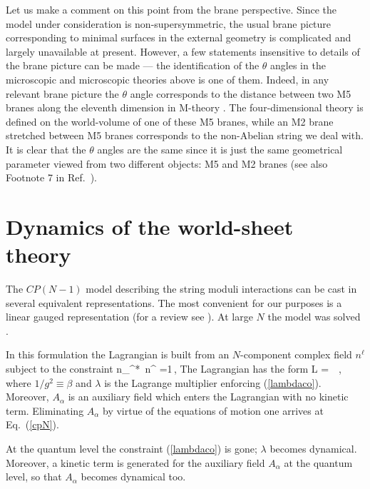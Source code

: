 Let us make  a comment on this point from
the  brane perspective. Since the model under consideration is 
non-supersymmetric,  the usual brane picture corresponding
to  minimal surfaces in the external geometry is
complicated and largely unavailable at present. However,
a few statements  insensitive to details
of the brane picture can be made --- the identification
of the $\theta$ angles in the microscopic and microscopic theories above
is one of them. Indeed, in any
relevant brane picture the $\theta$ angle corresponds
to the distance between two M5 branes along the
eleventh dimension in M-theory \cite{haho}. The four-dimensional
theory is defined on the world-volume of one of these M5 branes,
while  an M2 brane stretched between M5
branes corresponds to the non-Abelian string we deal with.
It is clear that the $\theta$ angles are the same since it is just
the same geometrical parameter viewed
from two different objects: M5 and M2 branes (see also Footnote 7
in Ref.~\cite{HananyTong}).

\section{Dynamics of the world-sheet theory}
\label{Dyn}

The $CP(N-1)$ model
describing the string moduli interactions can be cast in
several equivalent representations.
The most convenient for our purposes
is a linear gauged representation
(for a review see \cite{NSVZsigma}). At large $N$ the model
was solved \cite{5,da}.

In this formulation  the Lagrangian is built from an $N$-component
complex field $n^{\ell}$ subject to the constraint
\beq
n_{\ell}^*\, n^{\ell} =1\,,
\label{lambdaco}
\eeq
The Lagrangian has the form
\beq
{\cal L} = \, \,,
\label{one}
\eeq
where $1/g^2\equiv \beta$ and  $\lambda$ is the Lagrange multiplier
enforcing (\ref{lambdaco}). Moreover,
$A_\alpha$ is an auxiliary field which enters the Lagrangian
with no kinetic term. Eliminating $A_\alpha$ by virtue of the
equations of motion one arrives at Eq.~(\ref{cpN}).

At the quantum level the constraint (\ref{lambdaco}) is gone;
$\lambda$ becomes dynamical. Moreover,
a  kinetic term is generated 
for the auxiliary field $A_\alpha$ at the quantum level, so that    $A_\alpha$
becomes dynamical too.

